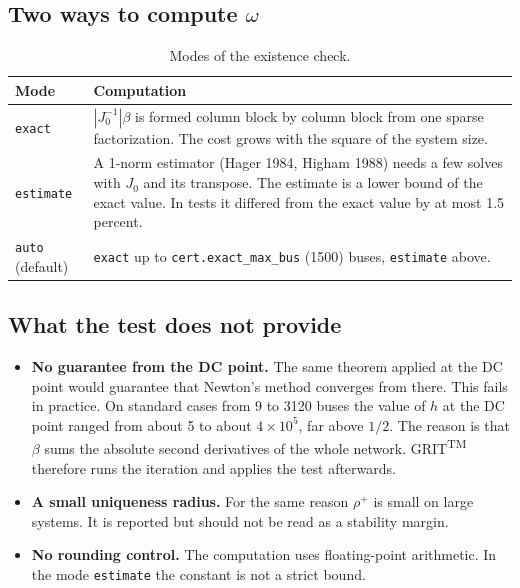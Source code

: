 \documentclass[a4paper,11pt]{article}
\newcommand{\TM}{\textsuperscript{TM}}
\newcommand{\GRIT}{GRIT\TM}
\newcommand{\opt}[1]{\texttt{#1}}
\begin{document}
\subsection{Two ways to compute \texorpdfstring{$\omega$}{omega}}

\begin{table}[H]\centering
\begin{tabular}{@{}lp{11.8cm}@{}}
\toprule
\textbf{Mode} & \textbf{Computation} \\
\midrule
\texttt{exact} & $|J_0^{-1}|\beta$ is formed column block by column block from one sparse factorization. The cost grows with the square of the system size. \\
\texttt{estimate} & A 1-norm estimator (Hager 1984, Higham 1988) needs a few solves with $J_0$ and its transpose. The estimate is a lower bound of the exact value. In tests it differed from the exact value by at most 1.5 percent. \\
\texttt{auto} (default) & \texttt{exact} up to \opt{cert.exact\_max\_bus} (1500) buses, \texttt{estimate} above. \\
\bottomrule
\end{tabular}
\caption{Modes of the existence check.}
\end{table}

\subsection{What the test does not provide}

\begin{itemize}[nosep]
  \item \textbf{No guarantee from the DC point.} The same theorem applied at the DC point would guarantee that Newton's method converges from there. This fails in practice. On standard cases from 9 to 3120 buses the value of $h$ at the DC point ranged from about 5 to about $4\times10^5$, far above $1/2$. The reason is that $\beta$ sums the absolute second derivatives of the whole network. \GRIT{} therefore runs the iteration and applies the test afterwards.
  \item \textbf{A small uniqueness radius.} For the same reason $\rho^+$ is small on large systems. It is reported but should not be read as a stability margin.
  \item \textbf{No rounding control.} The computation uses floating-point arithmetic. In the mode \texttt{estimate} the constant is not a strict bound.
\end{itemize}
\end{document}
